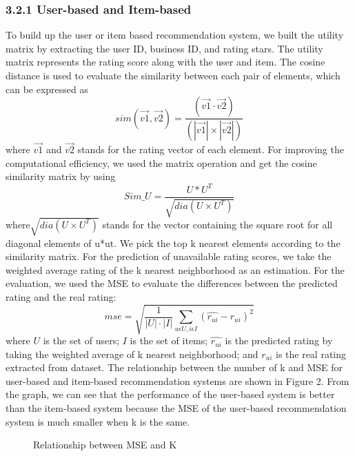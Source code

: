 \documentclass{neu_handout}
\begin{document}
\subsubsection*{3.2.1 User-based and Item-based}
To build up the user or item based recommendation system, we built the utility matrix by extracting the user ID, business ID, and rating stars. The utility matrix represents the rating score along with the user and item. The cosine distance is used to evaluate the similarity between each pair of elements, which can be expressed as 
  $$sim(\vec{v1}, \vec{v2}) = \frac{(\vec{v1}\cdot\vec{v2}) }{( |\vec{v1}|\times|\vec{v2}|)}$$
  where $\vec{v1}$ and $\vec{v2}$ stands for the rating vector of each element. For improving the computational efficiency, we used the matrix operation and get the cosine similarity matrix by using 
 $$Sim\_U=\frac{U*U^T}{\sqrt{dia(U\times U^T)}}$$
 where$ \sqrt{dia(U\times U^T)}$ stands for the vector containing the square root for all diagonal elements of u*ut. We pick the top k nearest elements according to the similarity matrix. For the prediction of unavailable rating scores, we take the weighted average rating of the k nearest neighborhood as an estimation. For the evaluation, we used the MSE to evaluate the differences between the predicted rating and the real rating:
 $$ mse=\sqrt{\frac{1}{|U|\cdot|I|}\sum_{u\epsilon U, i\epsilon I}^{} (\hat{r_{ui}}-r_{ui})^2}$$
 where $U$ is the set of users; $I$ is the set of items; $\hat{r_{ui}}$ is the predicted rating by taking the weighted average of k nearest neighborhood; and $r_{ui}$ is the real rating extracted from dataset. The relationship between the number of k and MSE for user-based and item-based recommendation systems are shown in Figure 2. From the graph, we can see that the performance of the user-based system is better than the item-based system because the MSE of the user-based recommendation system is much smaller when k is the same.

\begin{figure}[h]
\centering
{}
\caption{Relationship between MSE and K}
\end{figure}
\end{document}
